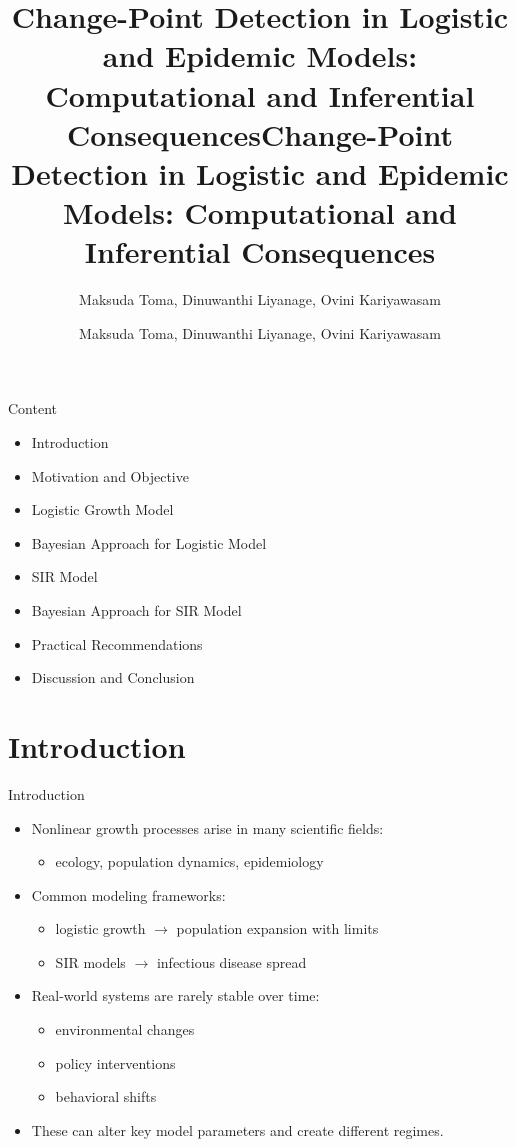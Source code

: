 \documentclass[
  ignorenonframetext,
  aspectratio=169,
]{beamer}
\title[Computational Statistics]{Change-Point Detection in Logistic and Epidemic Models: Computational and Inferential Consequences}
\author[UNL]{Maksuda Toma, Dinuwanthi Liyanage, Ovini Kariyawasam}
\title{Change-Point Detection in Logistic and Epidemic Models:
Computational and Inferential Consequences}
\author{Maksuda Toma, Dinuwanthi Liyanage, Ovini Kariyawasam}
\date{}
\institute{Department of Statistics, University of Nebraska--Lincoln}
\providecommand{\tightlist}{%
  \setlength{\itemsep}{0pt}\setlength{\parskip}{0pt}}\usepackage{longtable,booktabs,array}
\begin{document}
\frame{\titlepage}


\begin{frame}{Content}
\label{content}
\begin{itemize}
\tightlist
\item
  Introduction
\item
  Motivation and Objective
\item
  Logistic Growth Model
\item
  Bayesian Approach for Logistic Model
\item
  SIR Model
\item
  Bayesian Approach for SIR Model
\item
  Practical Recommendations
\item
  Discussion and Conclusion
\end{itemize}
\end{frame}

\section{Introduction}\label{introduction}

\begin{frame}{Introduction}
\label{introduction-1}
\begin{itemize}
\tightlist
\item
  Nonlinear growth processes arise in many scientific fields:

  \begin{itemize}
  \tightlist
  \item
    ecology, population dynamics, epidemiology
  \end{itemize}
\item
  Common modeling frameworks:

  \begin{itemize}
  \tightlist
  \item
    logistic growth \(\rightarrow\) population expansion with limits
  \item
    SIR models \(\rightarrow\) infectious disease spread
  \end{itemize}
\item
  Real-world systems are rarely stable over time:

  \begin{itemize}
  \tightlist
  \item
    environmental changes
  \item
    policy interventions
  \item
    behavioral shifts
  \end{itemize}
\item
  These can alter key model parameters and create different regimes.
\end{itemize}
\end{frame}
\end{document}
